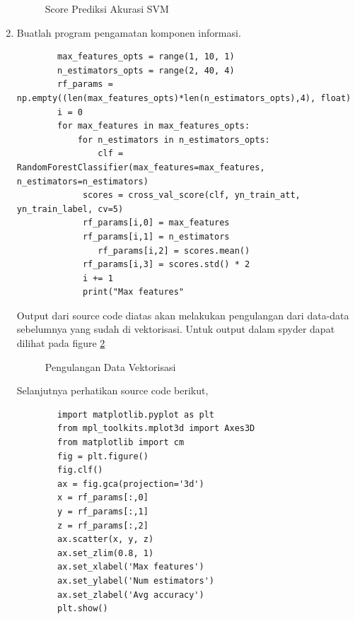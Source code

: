 \begin{enumerate}
	\begin{figure}[ht]
		\caption{Score Prediksi Akurasi SVM}
		\label{YNC4-24}
	\end{figure}

\item Buatlah program pengamatan komponen informasi.

	\begin{verbatim}
		max_features_opts = range(1, 10, 1)
		n_estimators_opts = range(2, 40, 4)
		rf_params = np.empty((len(max_features_opts)*len(n_estimators_opts),4), float)
		i = 0
		for max_features in max_features_opts:
    		for n_estimators in n_estimators_opts:
        		clf = RandomForestClassifier(max_features=max_features, n_estimators=n_estimators)
       		 scores = cross_val_score(clf, yn_train_att, yn_train_label, cv=5)
      		 rf_params[i,0] = max_features
       		 rf_params[i,1] = n_estimators
        		rf_params[i,2] = scores.mean()
       		 rf_params[i,3] = scores.std() * 2
       		 i += 1
       		 print("Max features"
	\end{verbatim}

Output dari source code diatas akan melakukan pengulangan dari data-data sebelumnya yang sudah di vektorisasi.  Untuk output dalam spyder dapat dilihat pada figure \ref{YNC4-25}

	\begin{figure}[ht]
		\caption{Pengulangan Data Vektorisasi}
		\label{YNC4-25}
	\end{figure}

Selanjutnya perhatikan source code berikut,

	\begin{verbatim}
		import matplotlib.pyplot as plt
		from mpl_toolkits.mplot3d import Axes3D
		from matplotlib import cm
		fig = plt.figure()
		fig.clf()
		ax = fig.gca(projection='3d')
		x = rf_params[:,0]
		y = rf_params[:,1]
		z = rf_params[:,2]
		ax.scatter(x, y, z)
		ax.set_zlim(0.8, 1)
		ax.set_xlabel('Max features')
		ax.set_ylabel('Num estimators')
		ax.set_zlabel('Avg accuracy')
		plt.show()
	\end{verbatim}


\end{enumerate}

